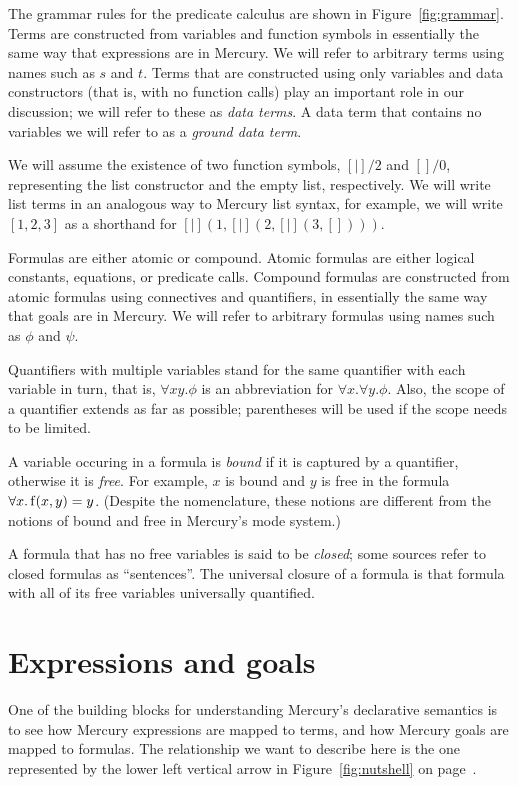 The grammar rules for the predicate calculus
are shown in Figure~\ref{fig:grammar}.
Terms are constructed from variables and function symbols
in essentially the same way that expressions are in Mercury.
We will refer to arbitrary terms using names such as $s$ and $t$.
Terms that are constructed using only variables and data constructors
(that is, with no function calls)
play an important role in our discussion;
we will refer to these as \emph{data terms}.
A data term that contains no variables
we will refer to as a \emph{ground data term}.

We will assume the existence of two function symbols,
$[|]/2$ and $[]/0$,
representing the list constructor and the empty list,
respectively.
We will write list terms in an analogous way to Mercury list syntax,
for example,
we will write
$[1, 2, 3]$ as a shorthand for $[|](1, [|](2, [|](3, [])))$.

Formulas are either atomic or compound.
Atomic formulas are either
logical constants, equations, or predicate calls.
Compound formulas are constructed from atomic formulas
using connectives and quantifiers,
in essentially the same way that goals are in Mercury.
We will refer to arbitrary formulas
using names such as $\phi$ and $\psi$.

Quantifiers with multiple variables stand for
the same quantifier with each variable in turn,
that is, $\forall x y.\phi$
is an abbreviation for $\forall x.\forall y.\phi$.
Also, the scope of a quantifier extends as far as possible;
parentheses will be used if the scope needs to be limited.

A variable occuring in a formula is \emph{bound\label{gi:bound}}
if it is captured by a quantifier,
otherwise it is \emph{free\label{gi:free}}.
For example,
$x$ is bound and $y$ is free
in the formula $\forall x. \operatorname{f}(x, y) = y$.
(Despite the nomenclature,
these notions are different from the notions of bound and free
in Mercury's mode system.)

A formula that has no free variables
is said to be \emph{closed\label{gi:closed-formula}};
some sources refer to closed formulas as ``sentences''.
The universal closure of a formula is that formula with
all of its free variables universally quantified.


\section{Expressions and goals}
\label{sec:goals}

One of the building blocks
for understanding Mercury's declarative semantics
is to see how Mercury expressions are mapped to terms,
and how Mercury goals are mapped to formulas.
The relationship we want to describe here is
the one represented by the lower left vertical arrow
in Figure~\ref{fig:nutshell} on page~\pageref{fig:nutshell}.

